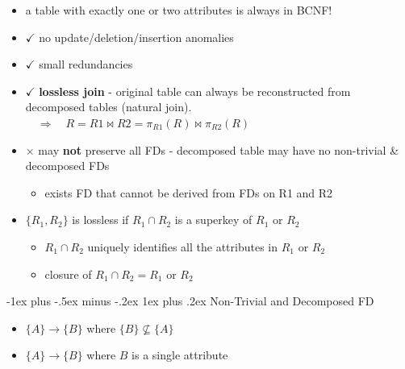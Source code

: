 \documentclass[10pt, landscape]{article}
\makeatletter
\renewcommand{\subsubsection}{\@startsection{subsubsection}{3}{0mm}%
  {-1ex plus -.5ex minus -.2ex}%
  {1ex plus .2ex}%
{\normalfont\small\bfseries}}%
\makeatother
\begin{document}
\begin{multicols}{4}
\begin{itemize}
    \item \attention a table with exactly one or two attributes is always in BCNF!
    \item $\checkmark$ no update/deletion/insertion anomalies
    \item $\checkmark$ small redundancies
    \item $\checkmark$ \textbf{lossless join} - original table can always be reconstructed from decomposed tables (natural join). $\quad \Rightarrow \quad R = R1 \Join R2 = \pi_{R1}(R) \Join \pi_{R2}(R)$
    \item $\times$ may \textbf{not} preserve all FDs - decomposed table may have no non-trivial \& decomposed FDs
      \begin{itemize}
        \item exists FD that cannot be derived from FDs on R1 and R2
      \end{itemize}
    \item {} $\{R_1, R_2\}$ is lossless if $R_1 \cap R_2$ is a superkey of $R_1$ or $R_2$ 
      \begin{itemize}
        \item $R_1 \cap R_2$ uniquely identifies all the attributes in $R_1$ or $R_2$
        \item closure of $R_1 \cap R_2 = R_1$ or $R_2$ 
      \end{itemize}
  \end{itemize}

  \subsubsection{Non-Trivial and Decomposed FD}
  \begin{itemize}
    \item {} $\{A\} \rightarrow \{B\}$ where $\{B\} \not\subseteq \{A\}$
    \item {} $\{A\} \rightarrow \{B\}$ where $B$ is a single attribute
  \end{itemize}


\end{multicols}
\end{document}
